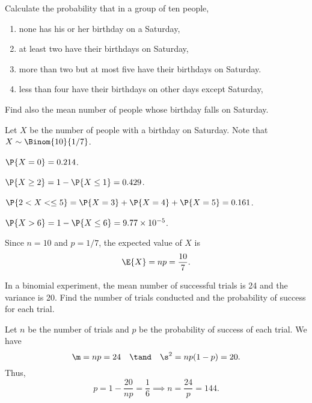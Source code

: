 \begin{problem}
    Calculate the probability that in a group of ten people,
    \begin{enumerate}
        \item none has his or her birthday on a Saturday,
        \item at least two have their birthdays on Saturday,
        \item more than two but at most five have their birthdays on Saturday.
        \item less than four have their birthdays on other days except Saturday,
    \end{enumerate}
    Find also the mean number of people whose birthday falls on Saturday.
\end{problem}
\begin{solution}
    Let $X$ be the number of people with a birthday on Saturday. Note that $X \sim \Binom{10}{1/7}$.
    \begin{ppart}
        $\P{X = 0} = 0.214$.
    \end{ppart}
    \begin{ppart}
        $\P{X \geq 2} = 1 - \P{X \leq 1} = 0.429$.
    \end{ppart}
    \begin{ppart}
        $\P{2 < X < \leq 5} = \P{X = 3} + \P{X = 4} + \P{X = 5} = 0.161$.
    \end{ppart}
    \begin{ppart}
        $\P{X > 6} = 1 - \P{X \leq 6} = 9.77 \times 10^{-5}$.
    \end{ppart}

    Since $n = 10$ and $p = 1/7$, the expected value of $X$ is \[\E{X} = np = \frac{10}{7}.\]
\end{solution}

\begin{problem}
    In a binomial experiment, the mean number of successful trials is 24 and the variance is 20. Find the number of trials conducted and the probability of success for each trial.
\end{problem}
\begin{solution}
    Let $n$ be the number of trials and $p$ be the probability of success of each trial. We have \[\m = np = 24 \quad \tand \quad \s^2 = np(1-p) = 20.\] Thus, \[p = 1 - \frac{20}{np} = \frac16 \implies n = \frac{24}{p} = 144.\]
\end{solution}

